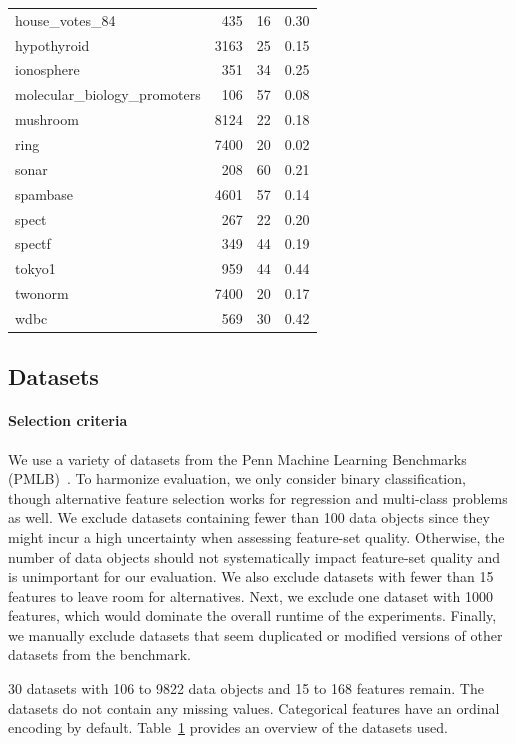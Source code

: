 \documentclass[iicol, sn-basic, Numbered]{sn-jnl} %
\theoremstyle{plain}
\theoremstyle{definition}
\begin{document}
\begin{table}[t]
\begin{tabular}{lrrr}
		house\_votes\_84 & 435 & 16 & 0.30 \\
		hypothyroid & 3163 & 25 & 0.15 \\
		ionosphere & 351 & 34 & 0.25 \\
		molecular\_biology\_promoters & 106 & 57 & 0.08 \\
		mushroom & 8124 & 22 & 0.18 \\
		ring & 7400 & 20 & 0.02 \\
		sonar & 208 & 60 & 0.21 \\
		spambase & 4601 & 57 & 0.14 \\
		spect & 267 & 22 & 0.20 \\
		spectf & 349 & 44 & 0.19 \\
		tokyo1 & 959 & 44 & 0.44 \\
		twonorm & 7400 & 20 & 0.17 \\
		wdbc & 569 & 30 & 0.42 \\
		\bottomrule
	\end{tabular}
	\label{tab:afs:datasets}
\end{table}

\subsection{Datasets}
\label{sec:afs:experimental-design:datasets}

\paragraph{Selection criteria}

We use a variety of datasets from the Penn Machine Learning Benchmarks (PMLB)~\cite{olson2017pmlb,romano2021pmlb}.
To harmonize evaluation, we only consider binary classification, though alternative feature selection works for regression and multi-class problems as well.
We exclude datasets containing fewer than 100 data objects since they might incur a high uncertainty when assessing feature-set quality.
Otherwise, the number of data objects should not systematically impact feature-set quality and is unimportant for our evaluation.
We also exclude datasets with fewer than 15 features to leave room for alternatives.
Next, we exclude one dataset with 1000 features, which would dominate the overall runtime of the experiments.
Finally, we manually exclude datasets that seem duplicated or modified versions of other datasets from the benchmark.

30 datasets with 106 to 9822 data objects and 15 to 168 features remain.
The datasets do not contain any missing values.
Categorical features have an ordinal encoding by default.
Table~\ref{tab:afs:datasets} provides an overview of the datasets used.
\end{document}
